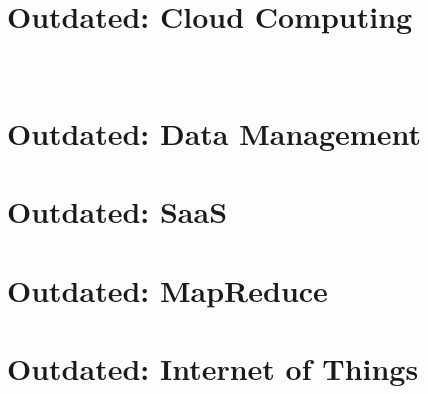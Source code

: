 
\part{Outdated: Cloud Computing}
\FILENAME\

%
%





\part{Outdated: Data Management}



\part{Outdated: SaaS}
\label{sec:icloud-saas}



\part{Outdated: MapReduce}





%
%

\part{Outdated: Internet of Things}


